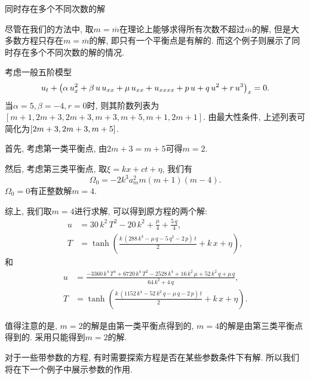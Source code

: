 \begin{example}同时存在多个不同次数的解

尽管在我们的方法中, 取$m=\overline{m}$在理论上能够求得所有次数不超过$\overline{m}$的解, 但是大多数方程只存在$m=\overline{m}$的解, 即只有一个平衡点是有解的. 而这个例子则展示了同时存在多个不同次数的解的情况.

考虑一般五阶模型\cite{kichenassamy1992existence}
\begin{equation}
    u_t+\left(\alpha\,u_x^2+\beta\,u\,{{u}_{xx}}+\mu\,{{u}_{xx}}+{{u}_{xxxx}}+p\,u+q\,{u}^{2}+r\,{u}^{3} \right)_x = 0. 
\end{equation}
当$\alpha=5,\beta=-4,r=0$时, 则其阶数列表为$[m+1,2m+3,2m+3,m+3,m+5,m+1,2m+1]$. 由最大性条件, 上述列表可简化为$\left[2m+3,2m+3,m+5\right]$.

首先, 考虑第一类平衡点, 由$2m+3=m+5$可得$m=2$.

然后, 考虑第三类平衡点, 取$\xi=kx+ct+\eta$, 我们有 
\[
    \Omega_0 = -2k^3a_m^2m(m+1)(m-4) .
\]
$\Omega_0=0$有正整数解$m=4$.

综上, 我们取$m=4$进行求解, 可以得到原方程的两个解:
\begin{equation}
\begin{aligned}
u&=30\,{k}^{2}\,{T}^{2}-20\,{k}^{2}+\frac{\mu}{4}+\frac{5\,q}{4}, \\
T&=\tanh\left( \frac{k\,\left( 288\,{k}^{4}-\mu\,q-5\,{q}^{2}-2\,p\right) \,t}{2}+k\,x+\eta\right),
\end{aligned}
\end{equation}
和
\begin{equation}
\begin{aligned}
u&=\frac{{-3360\,{k}^{4}\,{T}^{4}+6720\,{k}^{4}\,{T}^{2}-2528\,{k}^{4}+16\,{k}^{2}\,\mu+52\,{k}^{2}\,q+\mu\,q}}{64\,{k}^{2}+4\,q} ,\\ 
T&=\tanh\left( \frac{k\,\left( 1152\,{k}^{4}-52\,{k}^{2}\,q-\mu\,q-2\,p\right) \,t}{2}+k\,x+\eta\right) .
\end{aligned}
\end{equation}

值得注意的是, $m=2$的解是由第一类平衡点得到的, $m=4$的解是由第三类平衡点得到的. 采用只能得到$m=2$的解. 
    
\end{example}

对于一些带参数的方程, 有时需要探索方程是否在某些参数条件下有解. 所以我们将在下一个例子中展示参数的作用.


